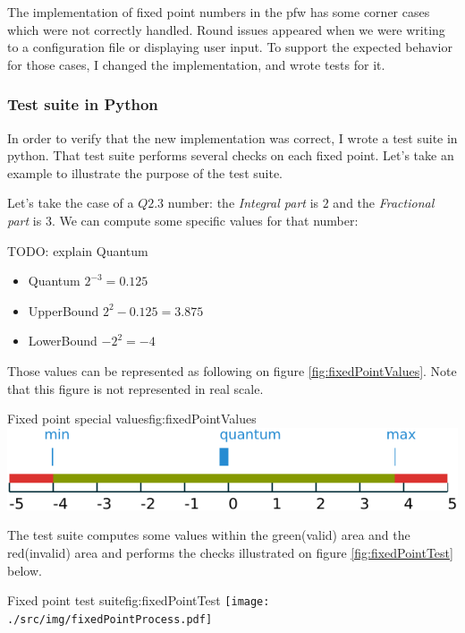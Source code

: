 The implementation of fixed point numbers in the \gls{pfw} has some
corner cases which were not correctly handled. Round issues appeared when we
were writing to a configuration file or displaying user input. To
support the expected behavior for those cases, I changed the implementation, and
wrote tests for it.

\subsubsection{Test suite in Python}

In order to verify that the new implementation was correct, I wrote a test suite
in \gls{python}. That test suite performs several checks on each fixed point. Let's
take an example to illustrate the purpose of the test suite.

Let's take the case of a $Q2.3$ number: the \emph{Integral part} is $2$ and the
\emph{Fractional part} is $3$. We can compute some specific values for that number:

TODO: explain Quantum
\begin{itemize}
    \item Quantum $2^{-3} = 0.125$
    \item UpperBound $2^2 - 0.125 = 3.875$
    \item LowerBound $-2^2 = -4$
\end{itemize}

Those values can be represented as following on figure \ref{fig:fixedPointValues}. Note that
this figure is not represented in real scale.
\begin{figureGraphics}{Fixed point special values}{fig:fixedPointValues}
    \includegraphics[width=\textwidth]{./src/img/fixedPoint.pdf}
\end{figureGraphics}

The test suite computes some values within the green(valid) area and the
red(invalid) area and performs the checks illustrated on figure \ref{fig:fixedPointTest} below.

\begin{figureGraphics}{Fixed point test suite}{fig:fixedPointTest}
    \texttt{[image: ./src/img/fixedPointProcess.pdf]}
\end{figureGraphics}

